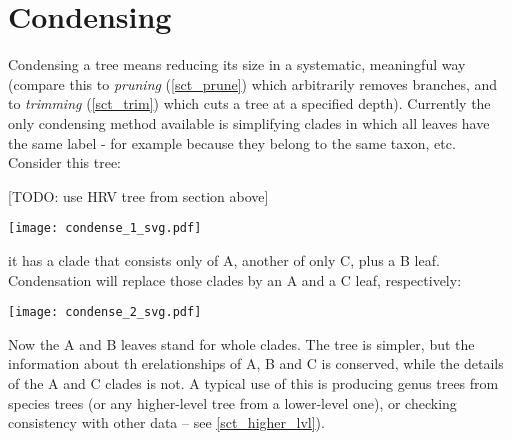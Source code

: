 \section{Condensing}
\label{sct_condense}

Condensing a tree means reducing its size in a systematic, meaningful way
(compare this to \emph{pruning} (\ref{sct_prune}) which arbitrarily removes
branches, and to \textit{trimming} (\ref{sct_trim}) which cuts a tree at a
specified depth). Currently the only condensing method available is
simplifying clades in which all leaves have the same label - for example
because they belong to the same taxon, etc. Consider this tree:

[TODO: use HRV tree from section above]

\begin{center}
\texttt{[image: condense\_1\_svg.pdf]}
\end{center}

\noindent{}it has a clade that consists only of A, another of only C, plus a B
leaf.  Condensation will replace those clades by an A and a C leaf,
respectively:


\begin{center}
\texttt{[image: condense\_2\_svg.pdf]}
\end{center}

\noindent{}Now the A and B leaves stand for whole clades. The tree is simpler,
but the information about th erelationships of A, B and C is conserved, while
the details of the A and C clades is not.  A typical use of this is producing
genus trees from species trees (or any higher-level tree from a lower-level
one), or checking consistency with other data -- see \ref{sct_higher_lvl}).
